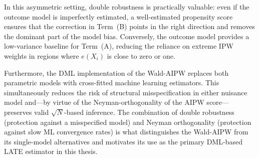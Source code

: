 \documentclass[12pt,a4paper]{article}
\theoremstyle{remark}
\begin{document}
In this asymmetric setting, double robustness is practically valuable: even if the
outcome model is imperfectly estimated, a well-estimated propensity score ensures
that the correction in Term~(B) points in the right direction and removes the
dominant part of the model bias. Conversely, the outcome model provides a low-variance
baseline for Term~(A), reducing the reliance on extreme IPW weights in regions where
$e(X_i)$ is close to zero or one.

Furthermore, the DML implementation of the Wald-AIPW \citep{chernozhukov2018double}
replaces both parametric models with cross-fitted machine learning estimators. This
simultaneously reduces the risk of structural misspecification in either nuisance model
and---by virtue of the Neyman-orthogonality of the AIPW score---preserves valid
$\sqrt{N}$-based inference. The combination of double robustness (protection against
a misspecified model) and Neyman orthogonality (protection against slow ML convergence
rates) is what distinguishes the Wald-AIPW from its single-model alternatives and
motivates its use as the primary DML-based LATE estimator in this thesis.



\end{document}
